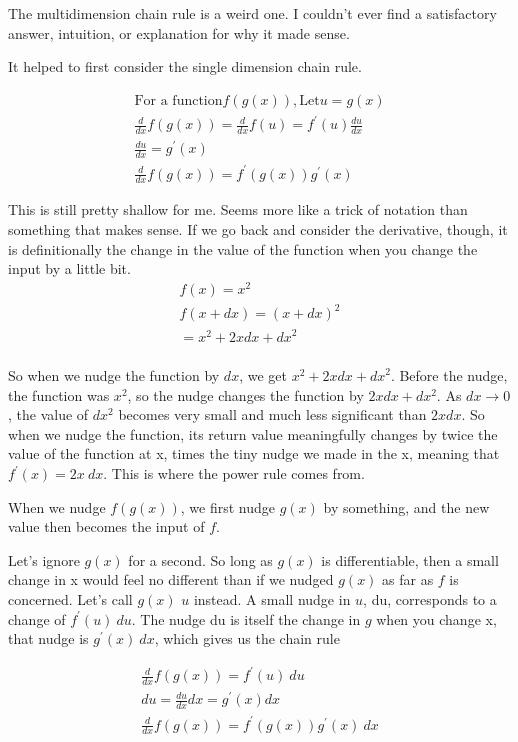 \documentclass[12pt, letterpaper]{article}
\begin{document}
The multidimension chain rule is a weird one. I couldn't ever find a satisfactory answer, intuition, or explanation for why it made sense.

It helped to first consider the single dimension chain rule.

\begin{gather*}
    \text{For a function} f(g(x)), \text{Let} u = g(x) \\
    \frac{d}{dx} f(g(x)) = \frac{d}{dx} f(u) = f^\prime (u)\frac{du}{dx}\\
    \frac{du}{dx} = g^\prime (x)\\
    \frac{d}{dx} f(g(x)) = f^\prime (g(x)) g^\prime (x)
\end{gather*}

This is still pretty shallow for me. Seems more like a trick of notation than something that makes sense. If we go back and consider the derivative, though, it is definitionally the change in the value of the function when you change the input by a little bit.
\begin{gather*}
    f(x) = x^2\\
    f(x + dx) = (x+dx)^2\\
    = x^2 + 2xdx + {dx}^2\\
\end{gather*}

So when we nudge the function by $dx$, we get $x^2 + 2xdx + {dx}^2$. Before the nudge, the function was $x^2$, so the nudge changes the function by $2xdx + dx^2$. As $dx \to 0$, the value of $dx^2$ becomes very small and much less significant than $2xdx$. So when we nudge the function, its return value meaningfully changes by twice the value of the function at x, times the tiny nudge we made in the x, meaning that $f^\prime (x) = 2x\ dx$. This is where the power rule comes from.

When we nudge $f(g(x))$, we first nudge $g(x)$ by something, and the new value then becomes the input of $f$.

Let's ignore $g(x)$ for a second. So long as $g(x)$ is differentiable, then a small change in x would feel no different than if we nudged $g(x)$ as far as $f$ is concerned. 
Let's call $g(x)$ $u$ instead. A small nudge in $u$, du, corresponds to a change of $f^\prime (u)\ du$. The nudge du is itself the change in $g$ when you change x, that nudge is $g^\prime (x)\ dx$, which gives us the chain rule

\begin{gather*}
    \frac{d}{dx} f(g(x)) = f^\prime (u)\ du\\
    du = \frac{du}{dx}dx = g^\prime (x) dx\\
    \frac{d}{dx} f(g(x)) = f^\prime (g(x)) g^\prime (x)\ dx
\end{gather*}
\end{document}
